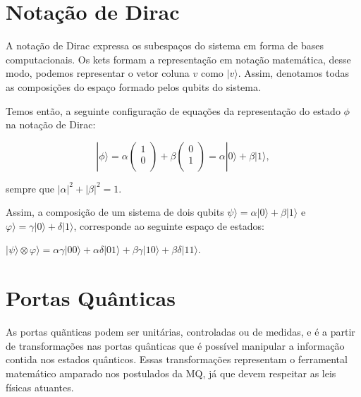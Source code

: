 \documentclass[tcc,capa]{texufpel}
\begin{document}
\section{Notação de Dirac}

A notação de Dirac expressa os subespaços do sistema em forma de bases computacionais. Os kets formam a representação em notação matemática, desse modo, podemos representar o vetor coluna $v$ como $|v\rangle$. Assim, denotamos todas as composições do espaço formado pelos qubits do sistema\cite{imre2005quantum}.

Temos então, a seguinte configuração de equações da representação do estado $\phi$ na notação de Dirac: 
\begin{center}
\begin{equation*}
    |\phi\rangle= \alpha \left(
         \begin{array}{c}
           1 \\
           0 \\
         \end{array}
       \right)
       + \beta \left(
         \begin{array}{c}
           0 \\
           1 \\
         \end{array}
       \right)
       =\alpha|0\rangle+\beta|1\rangle,
\end{equation*}
    
\end{center}

sempre que $|\alpha|^2+|\beta|^2=1$.

Assim, a composição de um sistema de dois qubits $\psi\rangle=\alpha|0\rangle+\beta|1\rangle$ e $\varphi\rangle=\gamma|0\rangle+\delta|1\rangle$, corresponde ao seguinte espaço de estados\cite{chuang00a}:

$|\psi\rangle \otimes \varphi\rangle= \alpha\gamma|00\rangle + \alpha\delta|01\rangle + \beta\gamma|10\rangle + \beta\delta|11\rangle$. 

\section{Portas Quânticas}
As portas quãnticas podem ser unitárias, controladas ou de medidas, e é a partir de transformações nas portas quânticas que é possível manipular a informação contida nos estados quânticos. Essas transformações representam o ferramental matemático amparado nos postulados da MQ, já que devem respeitar as leis físicas atuantes.
\end{document}
